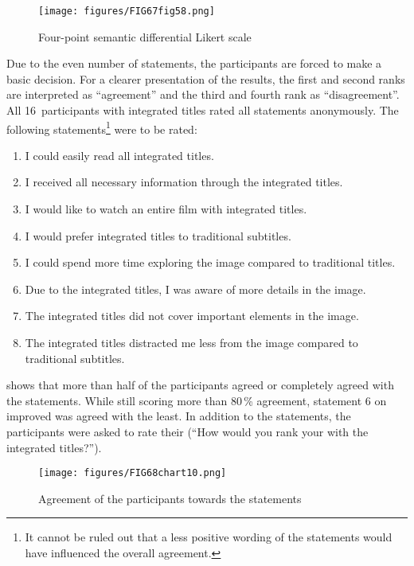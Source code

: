 \begin{figure}
\texttt{[image: figures/FIG67fig58.png]}
\caption{Four-point semantic differential Likert scale}
\label{fig:FIG67fig58}
\end{figure}

Due to the even number of statements, the participants are forced to make a basic decision. For a clearer presentation of the results, the first and second ranks are interpreted as “agreement” and the third and fourth rank as “disagreement”. All 16~participants with integrated titles rated all statements anonymously. The following statements\footnote{It cannot be ruled out that a less positive wording of the statements would have influenced the overall agreement.} were to be rated:


\begin{enumerate}
\item I could easily read all integrated titles.
\item I received all necessary information through the integrated titles.
\item I would like to watch an entire film with integrated titles.
\item I would prefer integrated titles to traditional subtitles.
\item I could spend more time exploring the image compared to traditional titles.
\item Due to the integrated titles, I was aware of more details in the image.
\item The integrated titles did not cover important elements in the image.
\item The integrated titles distracted me less from the image compared to traditional subtitles.
\end{enumerate}

 shows that more than half of the participants agreed or completely agreed with the statements. While still scoring more than 80\,\% agreement, statement 6 on improved  was agreed with the least. In addition to the statements, the participants were asked to rate their  (“How would you rank your  with the integrated titles?”).

\begin{figure}
\texttt{[image: figures/FIG68chart10.png]}
\caption{Agreement of the participants towards the statements}
\label{fig:FIG68}
\end{figure}

